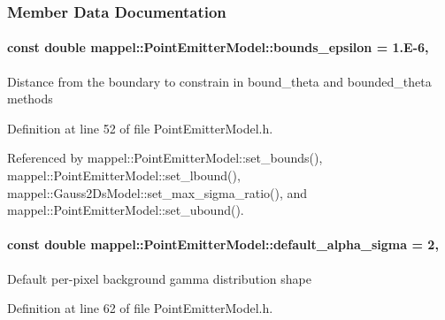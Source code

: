 \subsubsection{Member Data Documentation}
\paragraph[{\texorpdfstring{bounds\+\_\+epsilon}{bounds_epsilon}}]{\setlength{\rightskip}{0pt plus 5cm}const double mappel\+::\+Point\+Emitter\+Model\+::bounds\+\_\+epsilon = 1.\+E-\/6\hspace{0.3cm}{\ttfamily [static]}, {\ttfamily [inherited]}}\hypertarget{classmappel_1_1PointEmitterModel_ac987a119137b85a27704b1c40e3fab8c}{}\label{classmappel_1_1PointEmitterModel_ac987a119137b85a27704b1c40e3fab8c}
Distance from the boundary to constrain in bound\+\_\+theta and bounded\+\_\+theta methods 

Definition at line 52 of file Point\+Emitter\+Model.\+h.



Referenced by mappel\+::\+Point\+Emitter\+Model\+::set\+\_\+bounds(), mappel\+::\+Point\+Emitter\+Model\+::set\+\_\+lbound(), mappel\+::\+Gauss2\+Ds\+Model\+::set\+\_\+max\+\_\+sigma\+\_\+ratio(), and mappel\+::\+Point\+Emitter\+Model\+::set\+\_\+ubound().

\paragraph[{\texorpdfstring{default\+\_\+alpha\+\_\+sigma}{default_alpha_sigma}}]{\setlength{\rightskip}{0pt plus 5cm}const double mappel\+::\+Point\+Emitter\+Model\+::default\+\_\+alpha\+\_\+sigma = 2\hspace{0.3cm}{\ttfamily [static]}, {\ttfamily [inherited]}}\hypertarget{classmappel_1_1PointEmitterModel_a0d9f2c5438940f329e75708987e8b343}{}\label{classmappel_1_1PointEmitterModel_a0d9f2c5438940f329e75708987e8b343}
Default per-\/pixel background gamma distribution shape 

Definition at line 62 of file Point\+Emitter\+Model.\+h.

